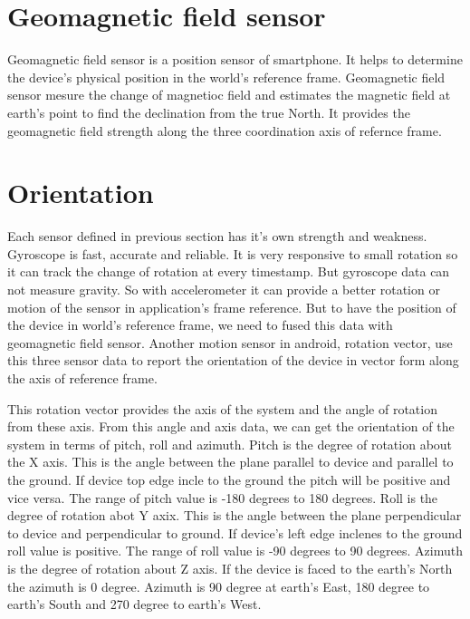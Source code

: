 \section{Geomagnetic field sensor}
Geomagnetic field sensor is a position sensor of smartphone.
It helps to determine the device's physical position in the world's reference frame.
Geomagnetic field sensor mesure the change of magnetioc field and estimates the magnetic field at earth's point to find the declination from the true North.
It provides the geomagnetic field strength along the three coordination axis of refernce frame.


\section{Orientation}
Each sensor defined in previous section has it's own strength and weakness.
Gyroscope is fast, accurate and reliable.
It is very responsive to small rotation so it can track the change of rotation at every timestamp.
But gyroscope data can not measure gravity.
So with accelerometer it can provide a better rotation or motion of the sensor in application's frame reference.
But to have the position of the device in world's reference frame, we need to fused this data with geomagnetic field sensor.
Another motion sensor in android, rotation vector, use this three sensor data to report the orientation of the device in vector form along the axis of reference frame.

This rotation vector provides the axis of the system and the angle of rotation from these axis.
From this angle and axis data, we can get the orientation of the system in terms of pitch, roll and azimuth.
Pitch is the degree of rotation about the X axis.
This is the angle between the plane parallel to device and parallel to the ground.
If device top edge incle to the ground the pitch will be positive and vice versa.
The range of pitch value is -180 degrees to 180 degrees.
Roll is the degree of rotation abot Y axix.
This is the angle between the plane perpendicular to device and perpendicular to ground.
If device's left edge inclenes to the ground roll value is positive.
The range of roll value is -90 degrees to 90 degrees.
Azimuth is the degree of rotation about Z axis.
If the device is faced to the earth's North the azimuth is 0 degree.
Azimuth is 90 degree at earth's East, 180 degree to earth's South and 270 degree to earth's West.





